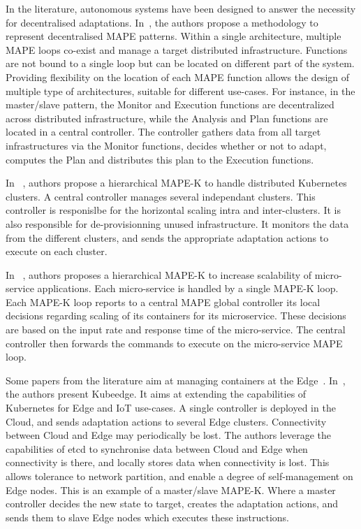 \documentclass{article}
\begin{document}
In the literature, autonomous systems have been designed to answer the necessity for decentralised adaptations. In~\cite{weyns_patterns_2013}, the authors propose a methodology to represent decentralised MAPE patterns. Within a single architecture, multiple MAPE loops co-exist and manage a target distributed infrastructure. Functions are not bound to a single loop but can be located on different part of the system. Providing flexibility on the location of each MAPE function allows the design of multiple type of architectures, suitable for different use-cases. For instance, in the master/slave pattern, the Monitor and Execution functions are decentralized across distributed infrastructure, while the Analysis and Plan functions are located in a central controller. The controller gathers data from all target infrastructures via the Monitor functions, decides whether or not to adapt, computes the Plan and distributes this plan to the Execution functions. 

In ~\cite{tamiru_mck8s_2021}, authors propose a hierarchical MAPE-K to handle distributed Kubernetes clusters. A central controller manages several independant clusters. This controller is responislbe for the horizontal scaling intra and inter-clusters. It is also responsible for de-provisionning unused infrastructure. It monitors the data from the different clusters, and sends the appropriate adaptation actions to execute on each cluster.

In ~\cite{rossi2020hierarchical}, authors proposes a hierarchical MAPE-K to increase scalability of micro-service applications. Each micro-service is handled by a single MAPE-K loop. Each MAPE-K loop reports to a central MAPE global controller its local decisions regarding scaling of its containers for its microservice. These decisions are based on the input rate and response time of the micro-service. The central controller then forwards the commands to execute on the micro-service MAPE loop.

Some papers from the literature aim at managing containers at the Edge~\cite{rossi_self-management_2019}. In~\cite{xiong_kubeedge_2018}, the authors present Kubeedge. It aims at extending the capabilities of Kubernetes for Edge and IoT use-cases. A single controller is deployed in the Cloud, and sends adaptation actions to several Edge clusters. Connectivity between Cloud and Edge may periodically be lost. The authors leverage the capabilities of etcd to synchronise data between Cloud and Edge when connectivity is there, and locally stores data when connectivity is lost. This allows tolerance to network partition, and enable a degree of self-management on Edge nodes. This is an example of a master/slave MAPE-K. Where a master controller decides the new state to target, creates the adaptation actions, and sends them to slave Edge nodes which executes these instructions.
\end{document}
